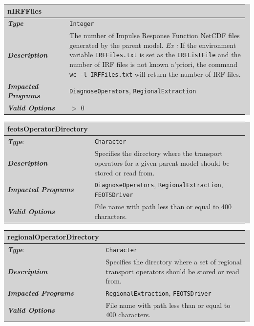 \documentclass{softwaremanual}
\begin{document}
\noindent\begingroup\setlength{\fboxsep}{0pt}
\colorbox{lightgray}{
\begin{tabular}{p{0.25\linewidth} p{0.725\linewidth}}
\toprule
\textbf{nIRFFiles} & \\
\midrule
\textbf{\textit{Type}} & \texttt{Integer} \\
\midrule
\textbf{\textit{Description}} & The number of Impulse Response Function NetCDF files generated by the parent model. \textit{Ex :} If the environment variable \texttt{IRFFiles.txt} is set as the \texttt{IRFListFile} and the number of IRF files is not known a'priori, the command \texttt{wc -l IRFFiles.txt} will return the number of IRF files. \\
\midrule
\textbf{\textit{Impacted Programs}} & \texttt{DiagnoseOperators}, \texttt{RegionalExtraction} \\
\midrule
\textbf{\textit{Valid Options}}  &  $>$ 0 \\
\bottomrule
\end{tabular}
}\endgroup

\noindent\begingroup\setlength{\fboxsep}{0pt}
\colorbox{lightgray}{
\begin{tabular}{p{0.25\linewidth} p{0.725\linewidth}}
\toprule
\textbf{feotsOperatorDirectory} & \\
\midrule
\textbf{\textit{Type}} & \texttt{Character} \\
\midrule
\textbf{\textit{Description}} & Specifies the directory where the transport operators for a given parent model should be stored or read from. \\
\midrule
\textbf{\textit{Impacted Programs}} & \texttt{DiagnoseOperators}, \texttt{RegionalExtraction}, \texttt{FEOTSDriver} \\
\midrule
\textbf{\textit{Valid Options}}  & File name with path less than or equal to 400 characters. \\
\bottomrule
\end{tabular}
}\endgroup

\noindent\begingroup\setlength{\fboxsep}{0pt}
\colorbox{lightgray}{
\begin{tabular}{p{0.25\linewidth} p{0.725\linewidth}}
\toprule
\textbf{regionalOperatorDirectory} & \\
\midrule
\textbf{\textit{Type}} & \texttt{Character} \\
\midrule
\textbf{\textit{Description}} & Specifies the directory where a set of regional transport operators should be stored or read from. \\
\midrule
\textbf{\textit{Impacted Programs}} & \texttt{RegionalExtraction}, \texttt{FEOTSDriver} \\
\midrule
\textbf{\textit{Valid Options}}  & File name with path less than or equal to 400 characters. \\
\bottomrule
\end{tabular}
}\endgroup
\end{document}
